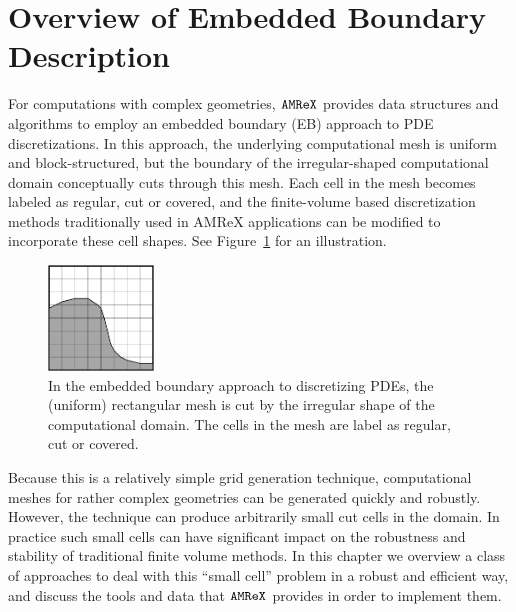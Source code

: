 \newcommand{\xbold}{{\bf x}}
\newcommand{\ibold}{{\bf i}}
\newcommand{\jbold}{{\bf j}}
\newcommand{\kbold}{{\bf k}}
\newcommand{\nbold}{{\bf n}}
\newcommand{\cbold}{{\bf c}}
\newcommand{\ebis}{{\tt EBIndexSpace}}
\newcommand{\baseif}{{\tt BaseIF}}
\newcommand{\sphereif}{{\tt SphereIF}}
\newcommand{\transformif}{{\tt TransformIF}}
\newcommand{\latheif}{{\tt LatheIF}}
\newcommand{\unionif}{{\tt UnionIF}}
\newcommand{\intersectionif}{{\tt IntersectionIF}}
\newcommand{\geom}{{\tt GeometryShop}}
\newcommand{\parm}{{\tt ParmParse}}

\section{Overview of Embedded Boundary Description}
\label{sec:EB:EBOverview}

For computations with complex geometries, $\tt{AMReX}$ provides data
structures and algorithms to employ an embedded boundary (EB) approach to
PDE discretizations.    In this approach, the underlying computational
mesh is uniform and block-structured, but the boundary of the irregular-shaped
computational domain conceptually cuts through this mesh.  Each cell in the mesh
becomes labeled as regular, cut or covered, and the finite-volume based
discretization methods traditionally used in AMReX applications can be
modified to incorporate these cell shapes.  See Figure~\ref{fig::ebexample}
for an illustration.
\begin{figure}[h]
  \centering
  \includegraphics[width=0.25\textwidth]{./EB/EB_example.pdf}
  \caption{\label{fig::ebexample}In the embedded boundary approach to
    discretizing PDEs, the (uniform) rectangular mesh is cut by the
    irregular shape of the computational domain.  The cells in the
    mesh are label as regular, cut or covered.}
\end{figure}
Because this is a relatively simple grid
generation technique, computational meshes for rather complex geometries
can be generated quickly and robustly.  However, the technique 
can produce arbitrarily small cut cells in the domain.  In practice such small
cells can have significant impact on the robustness and stability of
traditional finite volume methods.  In this chapter we overview
a class of approaches to deal with this ``small cell'' problem in a
robust and efficient way, and discuss the tools and data that $\tt{AMReX}$
provides in order to implement them.  

